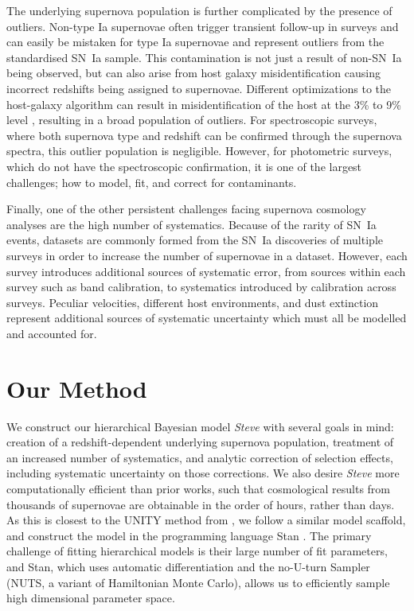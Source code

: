 \documentclass[a4paper,fleqn,usenatbib,manuscript]{emulateapj}
\newcommand{\steve}{\textit{Steve}}
\newcommand{\rubin}{\citetalias{Rubin2015}}
\begin{document}
The underlying supernova population is further complicated by the presence of outliers. Non-type Ia supernovae often trigger transient follow-up in surveys and can easily be mistaken for type Ia supernovae  and represent outliers from the standardised SN~Ia sample. This contamination is not just a result of non-SN~Ia being observed, but can also arise from host galaxy misidentification causing incorrect redshifts  being assigned to supernovae. Different optimizations to the host-galaxy algorithm can result in misidentification of the host at the 3\% to 9\% level \citep{Gupta2016}, resulting in a broad population of outliers. For spectroscopic surveys, where both supernova type and redshift can be confirmed through the supernova spectra, this outlier population is negligible. However, for photometric surveys, which do not have the spectroscopic confirmation, it is one of the largest challenges; how to model, fit, and correct for contaminants.

Finally, one of the other persistent challenges facing supernova cosmology analyses are the high number of systematics. Because of the rarity of SN~Ia events, datasets are commonly formed from the SN~Ia discoveries of multiple surveys in order to increase the number of supernovae in a dataset. However, each survey introduces additional sources of systematic error, from sources within each survey such as band calibration, to systematics introduced by calibration across surveys. Peculiar velocities, different host environments, and dust extinction represent additional sources of systematic uncertainty which must all be modelled and accounted for. 



\section{Our Method}
\label{sec:method}

We construct our hierarchical Bayesian model {\steve} with several goals in mind: creation of a redshift-dependent underlying supernova population,  treatment of an increased number of systematics, and analytic correction of selection effects, including systematic uncertainty on those corrections. We also desire {\steve} more computationally efficient than prior works, such that cosmological results from thousands of supernovae are obtainable in the order of hours, rather than days. As this is closest to the UNITY method from \citet[][hereafter denoted \rubin]{Rubin2015}, we follow a similar model scaffold, and construct the model in the programming language Stan \citep{Carpenter2017, StanDevelopmentTeam2017}. The primary challenge of fitting hierarchical models is their large number of fit parameters, and Stan, which uses automatic differentiation and the no-U-turn Sampler (NUTS, a variant of Hamiltonian Monte Carlo), allows us to efficiently sample high dimensional parameter space.
\end{document}
